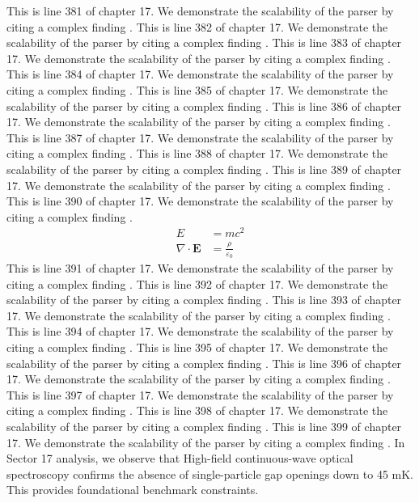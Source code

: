 This is line 381 of chapter 17. We demonstrate the scalability of the parser by citing a complex finding \cite{ref17_381}.
This is line 382 of chapter 17. We demonstrate the scalability of the parser by citing a complex finding \cite{ref17_382}.
This is line 383 of chapter 17. We demonstrate the scalability of the parser by citing a complex finding \cite{ref17_383}.
This is line 384 of chapter 17. We demonstrate the scalability of the parser by citing a complex finding \cite{ref17_384}.
This is line 385 of chapter 17. We demonstrate the scalability of the parser by citing a complex finding \cite{ref17_385}.
This is line 386 of chapter 17. We demonstrate the scalability of the parser by citing a complex finding \cite{ref17_386}.
This is line 387 of chapter 17. We demonstrate the scalability of the parser by citing a complex finding \cite{ref17_387}.
This is line 388 of chapter 17. We demonstrate the scalability of the parser by citing a complex finding \cite{ref17_388}.
This is line 389 of chapter 17. We demonstrate the scalability of the parser by citing a complex finding \cite{ref17_389}.
This is line 390 of chapter 17. We demonstrate the scalability of the parser by citing a complex finding \cite{ref17_390}.
\begin{align*}
  E &= mc^2 \\
  \nabla \cdot \mathbf{E} &= \frac{\rho}{\varepsilon_0}
\end{align*}
This is line 391 of chapter 17. We demonstrate the scalability of the parser by citing a complex finding \cite{ref17_391}.
This is line 392 of chapter 17. We demonstrate the scalability of the parser by citing a complex finding \cite{ref17_392}.
This is line 393 of chapter 17. We demonstrate the scalability of the parser by citing a complex finding \cite{ref17_393}.
This is line 394 of chapter 17. We demonstrate the scalability of the parser by citing a complex finding \cite{ref17_394}.
This is line 395 of chapter 17. We demonstrate the scalability of the parser by citing a complex finding \cite{ref17_395}.
This is line 396 of chapter 17. We demonstrate the scalability of the parser by citing a complex finding \cite{ref17_396}.
This is line 397 of chapter 17. We demonstrate the scalability of the parser by citing a complex finding \cite{ref17_397}.
This is line 398 of chapter 17. We demonstrate the scalability of the parser by citing a complex finding \cite{ref17_398}.
This is line 399 of chapter 17. We demonstrate the scalability of the parser by citing a complex finding \cite{ref17_399}.
In Sector 17 analysis, we observe that High-field continuous-wave optical spectroscopy confirms the absence of single-particle gap openings down to 45 mK. This provides foundational benchmark constraints.
